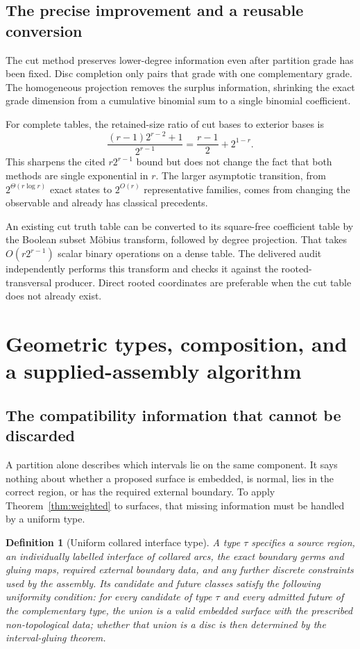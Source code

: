 \documentclass[11pt,a4paper]{article}
\newtheorem{definition}[theorem]{Definition}
\theoremstyle{remark}\newtheorem{remark}[theorem]{Remark}
\begin{document}
\subsection{The precise improvement and a reusable conversion}
The cut method preserves lower-degree information even after partition grade has been fixed. Disc completion only pairs that grade with one complementary grade. The homogeneous projection removes the surplus information, shrinking the exact grade dimension from a cumulative binomial sum to a single binomial coefficient.

For complete tables, the retained-size ratio of cut bases to exterior bases is
\[
 \frac{(r-1)2^{r-2}+1}{2^{r-1}}
 =\frac{r-1}{2}+2^{1-r}.
\]
This sharpens the cited $r2^{r-1}$ bound but does not change the fact that both methods are single exponential in $r$. The larger asymptotic transition, from $2^{\Theta(r\log r)}$ exact states to $2^{O(r)}$ representative families, comes from changing the observable and already has classical precedents.

An existing cut truth table can be converted to its square-free coefficient table by the Boolean subset M\"obius transform, followed by degree projection. That takes $O(r2^{r-1})$ scalar binary operations on a dense table. The delivered audit independently performs this transform and checks it against the rooted-transversal producer. Direct rooted coordinates are preferable when the cut table does not already exist.

\section{Geometric types, composition, and a supplied-assembly algorithm}\label{sec:composition}
\subsection{The compatibility information that cannot be discarded}
A partition alone describes which intervals lie on the same component. It says nothing about whether a proposed surface is embedded, is normal, lies in the correct region, or has the required external boundary. To apply Theorem~\ref{thm:weighted} to surfaces, that missing information must be handled by a uniform type.

\begin{definition}[Uniform collared interface type]\label{def:type}
A type $\tau$ specifies a source region, an individually labelled interface of collared arcs, the exact boundary germs and gluing maps, required external boundary data, and any further discrete constraints used by the assembly. Its candidate and future classes satisfy the following uniformity condition: for every candidate of type $\tau$ and every admitted future of the complementary type, the union is a valid embedded surface with the prescribed non-topological data; whether that union is a disc is then determined by the interval-gluing theorem.
\end{definition}
\end{document}
